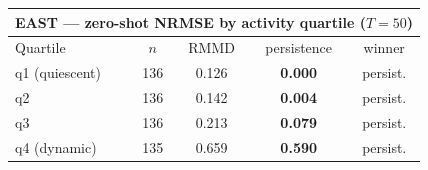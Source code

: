 \begin{tabular}{lcccc}
\toprule
\multicolumn{5}{c}{EAST --- zero-shot NRMSE by activity quartile ($T{=}50$)} \\
\midrule
Quartile & $n$ & RMMD & persistence & winner \\
\midrule
q1 (quiescent) & 136 & 0.126 & \textbf{0.000} & persist. \\
q2 & 136 & 0.142 & \textbf{0.004} & persist. \\
q3 & 136 & 0.213 & \textbf{0.079} & persist. \\
q4 (dynamic) & 135 & 0.659 & \textbf{0.590} & persist. \\
\bottomrule
\end{tabular}
